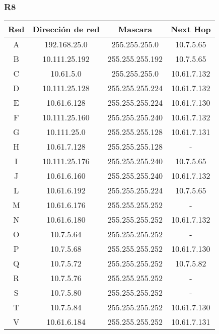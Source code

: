 \subsubsection{R8}
\begin{table}[!htbp]
\centering
  \begin{tabular}{|c|c|c|c|}
  \hline
Red & Dirección de red & Mascara & Next Hop\\ \hline
A & 192.168.25.0 & 255.255.255.0 & 10.7.5.65 \\ \hline
B & 10.111.25.192 & 255.255.255.192 & 10.7.5.65 \\ \hline
C & 10.61.5.0 & 255.255.255.0 & 10.61.7.132 \\ \hline
D & 10.111.25.128 & 255.255.255.224 & 10.61.7.132 \\ \hline
E & 10.61.6.128 & 255.255.255.224 & 10.61.7.130 \\ \hline
F & 10.111.25.160 & 255.255.255.240 & 10.61.7.132 \\ \hline
G & 10.111.25.0 & 255.255.255.128 & 10.61.7.131 \\ \hline
H & 10.61.7.128 & 255.255.255.128 & -\\ \hline
I & 10.111.25.176 & 255.255.255.240 & 10.7.5.65 \\ \hline
J & 10.61.6.160 & 255.255.255.240 & 10.61.7.132 \\ \hline
L & 10.61.6.192 & 255.255.255.224 & 10.7.5.65 \\ \hline
M & 10.61.6.176 & 255.255.255.252 & -\\ \hline
N & 10.61.6.180 & 255.255.255.252 & 10.61.7.132 \\ \hline
O & 10.7.5.64 & 255.255.255.252 & -\\ \hline
P & 10.7.5.68 & 255.255.255.252 & 10.61.7.130 \\ \hline
Q & 10.7.5.72 & 255.255.255.252 & 10.7.5.82 \\ \hline
R & 10.7.5.76 & 255.255.255.252 & -\\ \hline
S & 10.7.5.80 & 255.255.255.252 & -\\ \hline
T & 10.7.5.84 & 255.255.255.252 & 10.61.7.130 \\ \hline
V & 10.61.6.184 & 255.255.255.252 &10.61.7.131 \\
  \hline
 \end{tabular}
\end{table}

\newpage
